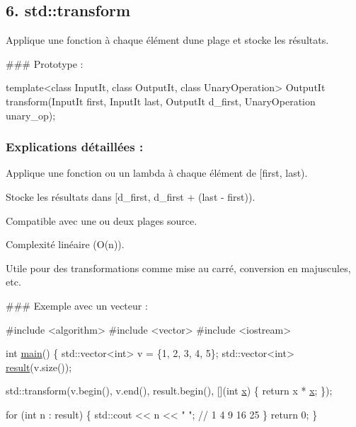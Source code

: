 \subsection*{6. {\bfseries std\+::transform}}

Applique une fonction à chaque élément d\textquotesingle{}une plage et stocke les résultats.

\#\#\# Prototype \+: 
\begin{DoxyCode}
\textcolor{keyword}{template}<\textcolor{keyword}{class} InputIt, \textcolor{keyword}{class} OutputIt, \textcolor{keyword}{class} UnaryOperation>
OutputIt transform(InputIt first, InputIt last, OutputIt d\_first, UnaryOperation unary\_op);
\end{DoxyCode}


\subsubsection*{Explications détaillées \+:}


\begin{DoxyItemize}
\item Applique une fonction ou un lambda à chaque élément de {\ttfamily \mbox{[}first, last)}.
\item Stocke les résultats dans {\ttfamily \mbox{[}d\+\_\+first, d\+\_\+first + (last -\/ first))}.
\item Compatible avec une ou deux plages source.
\item Complexité linéaire (O(n)).
\item Utile pour des transformations comme mise au carré, conversion en majuscules, etc.
\end{DoxyItemize}

\#\#\# Exemple avec un vecteur \+: 
\begin{DoxyCode}
\textcolor{preprocessor}{#include <algorithm>}
\textcolor{preprocessor}{#include <vector>}
\textcolor{preprocessor}{#include <iostream>}

\textcolor{keywordtype}{int} \hyperlink{htop_8c_a3c04138a5bfe5d72780bb7e82a18e627}{main}() \{
    std::vector<int> v = \{1, 2, 3, 4, 5\};
    std::vector<int> \hyperlink{namespaceconnexion__SSH_ab06475dbad7f16b89c9114749bc95254}{result}(v.size());

    std::transform(v.begin(), v.end(), result.begin(), [](\textcolor{keywordtype}{int} \hyperlink{addition_8c_a6150e0515f7202e2fb518f7206ed97dc}{x}) \{ \textcolor{keywordflow}{return} x * \hyperlink{addition_8c_a6150e0515f7202e2fb518f7206ed97dc}{x}; \});

    \textcolor{keywordflow}{for} (\textcolor{keywordtype}{int} n : result) \{
        std::cout << n << \textcolor{stringliteral}{" "}; \textcolor{comment}{// 1 4 9 16 25}
    \}
    \textcolor{keywordflow}{return} 0;
\}
\end{DoxyCode}
 



